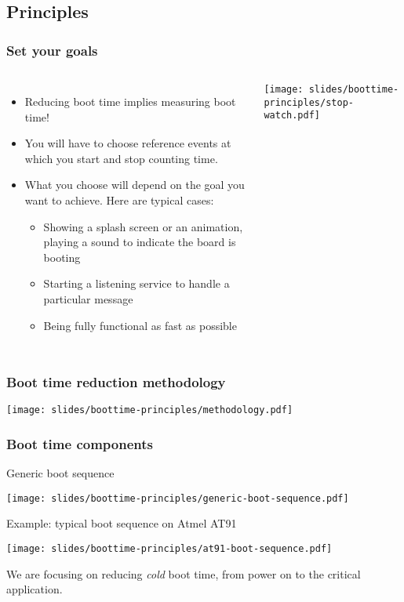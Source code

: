 \subsection{Principles}

\begin{frame}
\frametitle{Set your goals}
\begin{columns}
    \begin{itemize}
	\item Reducing boot time implies measuring boot time!
	\item You will have to choose reference events at which you
       	      start and stop counting time.
	\item What you choose will depend on the goal you want to
              achieve. Here are typical cases:
	\begin{itemize}
		\item Showing a splash screen or an animation, playing a sound to
	              indicate the board is booting
		\item Starting a listening service to handle a particular
	              message
	        \item Being fully functional as fast as possible
	\end{itemize}
    \end{itemize}
    \texttt{[image: slides/boottime-principles/stop-watch.pdf]}
  \end{columns}
\end{frame}

\begin{frame}
\frametitle{Boot time reduction methodology}
\begin{center}
    \texttt{[image: slides/boottime-principles/methodology.pdf]}
\end{center}
\end{frame}

\begin{frame}
\frametitle{Boot time components}
Generic boot sequence
\begin{center}
    \texttt{[image: slides/boottime-principles/generic-boot-sequence.pdf]}
\end{center}
Example: typical boot sequence on Atmel AT91
\begin{center}
    \texttt{[image: slides/boottime-principles/at91-boot-sequence.pdf]}
\end{center}
We are focusing on reducing {\em cold} boot time, from power on to the
critical application.
\end{frame}

